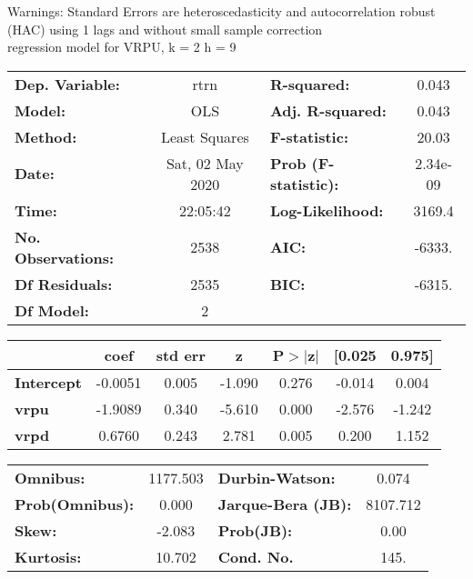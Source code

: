 Warnings: \newline
 [1] Standard Errors are heteroscedasticity and autocorrelation robust (HAC) using 1 lags and without small sample correction\\ 

regression model for VRPU, k = 2 h = 9\begin{center}
\begin{tabular}{lclc}
\toprule
\textbf{Dep. Variable:}    &       rtrn       & \textbf{  R-squared:         } &     0.043   \\
\textbf{Model:}            &       OLS        & \textbf{  Adj. R-squared:    } &     0.043   \\
\textbf{Method:}           &  Least Squares   & \textbf{  F-statistic:       } &     20.03   \\
\textbf{Date:}             & Sat, 02 May 2020 & \textbf{  Prob (F-statistic):} &  2.34e-09   \\
\textbf{Time:}             &     22:05:42     & \textbf{  Log-Likelihood:    } &    3169.4   \\
\textbf{No. Observations:} &        2538      & \textbf{  AIC:               } &    -6333.   \\
\textbf{Df Residuals:}     &        2535      & \textbf{  BIC:               } &    -6315.   \\
\textbf{Df Model:}         &           2      & \textbf{                     } &             \\
\bottomrule
\end{tabular}
\begin{tabular}{lcccccc}
                   & \textbf{coef} & \textbf{std err} & \textbf{z} & \textbf{P$> |$z$|$} & \textbf{[0.025} & \textbf{0.975]}  \\
\midrule
\textbf{Intercept} &      -0.0051  &        0.005     &    -1.090  &         0.276        &       -0.014    &        0.004     \\
\textbf{vrpu}      &      -1.9089  &        0.340     &    -5.610  &         0.000        &       -2.576    &       -1.242     \\
\textbf{vrpd}      &       0.6760  &        0.243     &     2.781  &         0.005        &        0.200    &        1.152     \\
\bottomrule
\end{tabular}
\begin{tabular}{lclc}
\textbf{Omnibus:}       & 1177.503 & \textbf{  Durbin-Watson:     } &    0.074  \\
\textbf{Prob(Omnibus):} &   0.000  & \textbf{  Jarque-Bera (JB):  } & 8107.712  \\
\textbf{Skew:}          &  -2.083  & \textbf{  Prob(JB):          } &     0.00  \\
\textbf{Kurtosis:}      &  10.702  & \textbf{  Cond. No.          } &     145.  \\
\bottomrule
\end{tabular}
\end{center}

